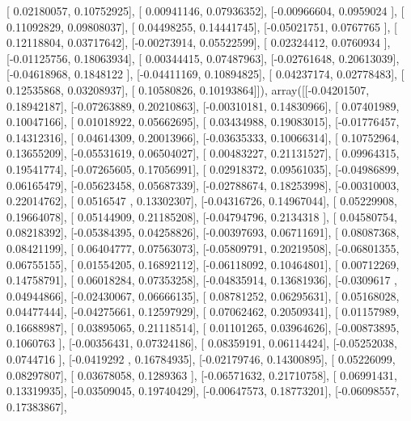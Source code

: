 \documentclass{article}
\begin{document}
       [ 0.02180057,  0.10752925],
       [ 0.00941146,  0.07936352],
       [-0.00966604,  0.0959024 ],
       [ 0.11092829,  0.09808037],
       [ 0.04498255,  0.14441745],
       [-0.05021751,  0.0767765 ],
       [ 0.12118804,  0.03717642],
       [-0.00273914,  0.05522599],
       [ 0.02324412,  0.0760934 ],
       [-0.01125756,  0.18063934],
       [ 0.00344415,  0.07487963],
       [-0.02761648,  0.20613039],
       [-0.04618968,  0.1848122 ],
       [-0.04411169,  0.10894825],
       [ 0.04237174,  0.02778483],
       [ 0.12535868,  0.03208937],
       [ 0.10580826,  0.10193864]]), array([[-0.04201507,  0.18942187],
       [-0.07263889,  0.20210863],
       [-0.00310181,  0.14830966],
       [ 0.07401989,  0.10047166],
       [ 0.01018922,  0.05662695],
       [ 0.03434988,  0.19083015],
       [-0.01776457,  0.14312316],
       [ 0.04614309,  0.20013966],
       [-0.03635333,  0.10066314],
       [ 0.10752964,  0.13655209],
       [-0.05531619,  0.06504027],
       [ 0.00483227,  0.21131527],
       [ 0.09964315,  0.19541774],
       [-0.07265605,  0.17056991],
       [ 0.02918372,  0.09561035],
       [-0.04986899,  0.06165479],
       [-0.05623458,  0.05687339],
       [-0.02788674,  0.18253998],
       [-0.00310003,  0.22014762],
       [ 0.0516547 ,  0.13302307],
       [-0.04316726,  0.14967044],
       [ 0.05229908,  0.19664078],
       [ 0.05144909,  0.21185208],
       [-0.04794796,  0.2134318 ],
       [ 0.04580754,  0.08218392],
       [-0.05384395,  0.04258826],
       [-0.00397693,  0.06711691],
       [ 0.08087368,  0.08421199],
       [ 0.06404777,  0.07563073],
       [-0.05809791,  0.20219508],
       [-0.06801355,  0.06755155],
       [ 0.01554205,  0.16892112],
       [-0.06118092,  0.10464801],
       [ 0.00712269,  0.14758791],
       [ 0.06018284,  0.07353258],
       [-0.04835914,  0.13681936],
       [-0.0309617 ,  0.04944866],
       [-0.02430067,  0.06666135],
       [ 0.08781252,  0.06295631],
       [ 0.05168028,  0.04477444],
       [-0.04275661,  0.12597929],
       [ 0.07062462,  0.20509341],
       [ 0.01157989,  0.16688987],
       [ 0.03895065,  0.21118514],
       [ 0.01101265,  0.03964626],
       [-0.00873895,  0.1060763 ],
       [-0.00356431,  0.07324186],
       [ 0.08359191,  0.06114424],
       [-0.05252038,  0.0744716 ],
       [-0.0419292 ,  0.16784935],
       [-0.02179746,  0.14300895],
       [ 0.05226099,  0.08297807],
       [ 0.03678058,  0.1289363 ],
       [-0.06571632,  0.21710758],
       [ 0.06991431,  0.13319935],
       [-0.03509045,  0.19740429],
       [-0.00647573,  0.18773201],
       [-0.06098557,  0.17383867],
\end{document}
